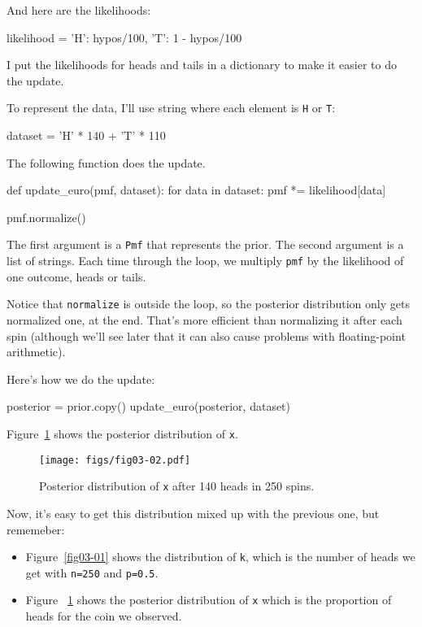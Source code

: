 \documentclass[12pt]{book}
\theoremstyle{exercise}
\newcommand{\py}[1]{{\tt #1}}%
\begin{document}
And here are the likelihoods:

\begin{code}
likelihood = {
    'H': hypos/100,
    'T': 1 - hypos/100
}
\end{code}

I put the likelihoods for heads and tails in a dictionary to make it easier to do the update.

To represent the data, I'll use string where each element is \py{H} or \py{T}:

\begin{code}
dataset = 'H' * 140 + 'T' * 110
\end{code}

The following function does the update.

\begin{code}
def update_euro(pmf, dataset):
    for data in dataset:
        pmf *= likelihood[data]

    pmf.normalize()
\end{code}

The first argument is a \py{Pmf} that represents the prior.
The second argument is a list of strings.
Each time through the loop, we multiply \py{pmf} by the likelihood of one outcome, heads or tails.

Notice that \py{normalize} is outside the loop, so the posterior distribution only gets normalized one, at the end.
That's more efficient than normalizing it after each spin (although we'll see later that it can also cause problems with floating-point arithmetic).

Here's how we do the update:

\begin{code}
posterior = prior.copy()
update_euro(posterior, dataset)
\end{code}

Figure~\ref{fig03-02} shows the posterior distribution of \py{x}.

\begin{figure}
\centerline{\texttt{[image: figs/fig03-02.pdf]}}
\caption{Posterior distribution of \py{x} after 140 heads in 250 spins.}
\label{fig03-02}
\end{figure}

Now, it's easy to get this distribution mixed up with the previous one, but rememeber:

\begin{itemize}

\item Figure~\ref{fig03-01} shows the distribution of \py{k}, which is the number of heads we get with \py{n=250} and \py{p=0.5}.

\item Figure ~\ref{fig03-02} shows the posterior distribution of \py{x} which is the proportion of heads for the coin we observed.

\end{itemize}
\end{document}
